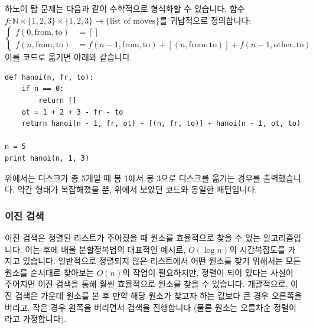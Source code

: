 \documentclass[../main.tex]{subfiles}
\begin{document}
하노이 탑 문제는 다음과 같이 수학적으로 형식화할 수 있습니다.
함수 $f: \mathbb{N} \times \{1, 2, 3\} \times \{1, 2, 3\} \rightarrow \{\text{list of moves}\}$를 귀납적으로 정의합니다:
\[
\begin{cases}f(0, \mathrm{from}, \mathrm{to}) &= []\\
f(n, \mathrm{from}, \mathrm{to}) &= f(n - 1, \mathrm{from}, \mathrm{to}) + [(n, \mathrm{from}, \mathrm{to})] + f(n - 1, \mathrm{other}, \mathrm{to})\end{cases}
\]
이를 코드로 옮기면 아래와 같습니다.
\begin{verbatim}
def hanoi(n, fr, to):
    if n == 0:
        return []
    ot = 1 + 2 + 3 - fr - to
    return hanoi(n - 1, fr, ot) + [(n, fr, to)] + hanoi(n - 1, ot, to)

n = 5
print hanoi(n, 1, 3)
\end{verbatim}
위에서는 디스크가 총 5개일 때 봉 1에서 봉 3으로 디스크를 옮기는 경우를 출력했습니다.
약간 형태가 복잡해졌을 뿐, 위에서 보았던 코드와 동일한 패턴입니다.

\subsubsection{이진 검색}
이진 검색은 정렬된 리스트가 주어졌을 때 원소를 효율적으로 찾을 수 있는 알고리즘입니다.
이는 후에 배울 분할정복법의 대표적인 예시로, $O(\log n)$의 시간복잡도를 가지고 있습니다.
일반적으로 정렬되지 않은 리스트에서 어떤 원소를 찾기 위해서는 모든 원소를 순서대로 찾아보는 $O(n)$의 작업이 필요하지만, 정렬이 되어 있다는 사실이 주어지면 이진 검색을 통해 훨씬 효율적으로 원소를 찾을 수 있습니다.
개괄적으로, 이진 검색은 가운데 원소를 본 후 만약 해당 원소가 찾고자 하는 값보다 큰 경우 오른쪽을 버리고, 작은 경우 왼쪽을 버리면서 검색을 진행합니다 (물론 원소는 오름차순 정렬이라고 가정합니다).
\end{document}
